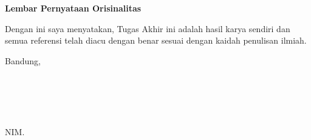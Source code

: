 \clearpage
\pagestyle{empty}

\begin{center}
    {\Large \bfseries Lembar Pernyataan Orisinalitas}
\end{center}
\vspace{15mm}

Dengan ini saya menyatakan, Tugas Akhir ini adalah hasil karya sendiri dan semua referensi telah diacu dengan benar sesuai dengan kaidah penulisan ilmiah.
\vspace{15mm}

Bandung, \thedate{} \yearsidang{} \\
\\
\\
\\
\\
\underline{\theauthor}\\
NIM. \nim
\clearpage
